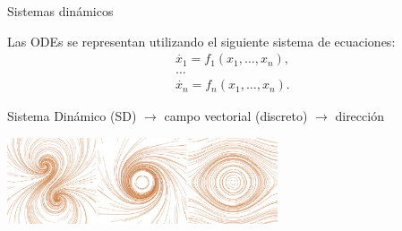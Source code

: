 \documentclass[spanish,unknownkeysallowed]{beamer}
\begin{document}
\begin{frame}{Sistemas dinámicos}

Las ODEs se representan utilizando el siguiente sistema de ecuaciones:
\begin{equation*}
  \begin{aligned}
    \dot{x_{1}} = f_{1}(x_{1},\ldots,x_{n}),\\
    \ldots\\
    \dot{x_{n}} = f_{n}(x_{1},\ldots,x_{n}).
  \end{aligned}
\end{equation*}






\vspace{0.1cm}

Sistema Dinámico (SD) $\rightarrow$ campo vectorial (discreto) $\rightarrow$ dirección



  \centerline{\includegraphics[width=8cm]{../figures/Fig2}}



\end{frame}
\end{document}

